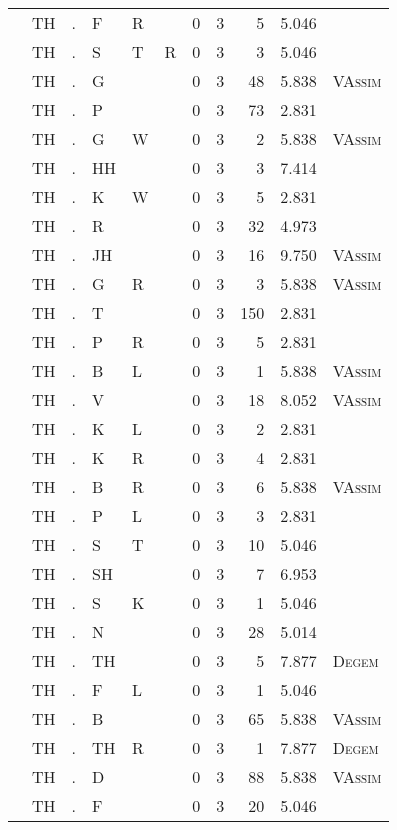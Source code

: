 \begin{longtable}{r@{ } r@{ } c@{ } l@{ } l@{ } l@{ } r r r r l }
 & TH & . & F & R &  & 0 & 3 & 5 & 5.046 &  \\
 & TH & . & S & T & R & 0 & 3 & 3 & 5.046 &  \\
 & TH & . & G &  &  & 0 & 3 & 48 & 5.838 & \textsc{VAssim} \\
 & TH & . & P &  &  & 0 & 3 & 73 & 2.831 &  \\
 & TH & . & G & W &  & 0 & 3 & 2 & 5.838 & \textsc{VAssim} \\
 & TH & . & HH &  &  & 0 & 3 & 3 & 7.414 &  \\
 & TH & . & K & W &  & 0 & 3 & 5 & 2.831 &  \\
 & TH & . & R &  &  & 0 & 3 & 32 & 4.973 &  \\
 & TH & . & JH &  &  & 0 & 3 & 16 & 9.750 & \textsc{VAssim} \\
 & TH & . & G & R &  & 0 & 3 & 3 & 5.838 & \textsc{VAssim} \\
 & TH & . & T &  &  & 0 & 3 & 150 & 2.831 &  \\
 & TH & . & P & R &  & 0 & 3 & 5 & 2.831 &  \\
 & TH & . & B & L &  & 0 & 3 & 1 & 5.838 & \textsc{VAssim} \\
 & TH & . & V &  &  & 0 & 3 & 18 & 8.052 & \textsc{VAssim} \\
 & TH & . & K & L &  & 0 & 3 & 2 & 2.831 &  \\
 & TH & . & K & R &  & 0 & 3 & 4 & 2.831 &  \\
 & TH & . & B & R &  & 0 & 3 & 6 & 5.838 & \textsc{VAssim} \\
 & TH & . & P & L &  & 0 & 3 & 3 & 2.831 &  \\
 & TH & . & S & T &  & 0 & 3 & 10 & 5.046 &  \\
 & TH & . & SH &  &  & 0 & 3 & 7 & 6.953 &  \\
 & TH & . & S & K &  & 0 & 3 & 1 & 5.046 &  \\
 & TH & . & N &  &  & 0 & 3 & 28 & 5.014 &  \\
 & TH & . & TH &  &  & 0 & 3 & 5 & 7.877 & \textsc{Degem} \\
 & TH & . & F & L &  & 0 & 3 & 1 & 5.046 &  \\
 & TH & . & B &  &  & 0 & 3 & 65 & 5.838 & \textsc{VAssim} \\
 & TH & . & TH & R &  & 0 & 3 & 1 & 7.877 & \textsc{Degem} \\
 & TH & . & D &  &  & 0 & 3 & 88 & 5.838 & \textsc{VAssim} \\
 & TH & . & F &  &  & 0 & 3 & 20 & 5.046 &  \\

\end{longtable}
